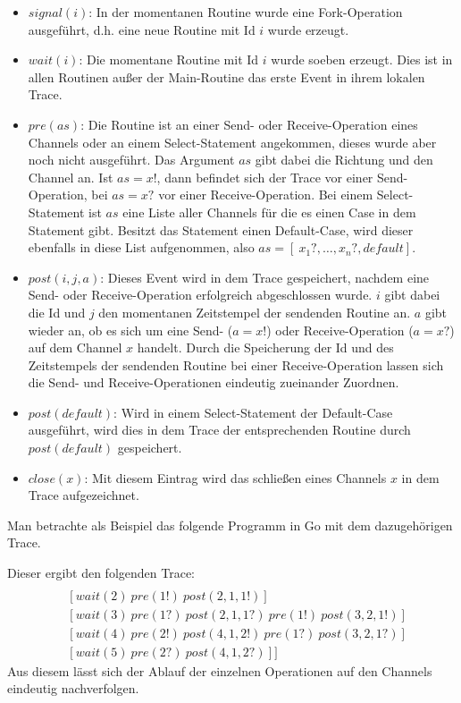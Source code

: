 \begin{itemize}
  \item $signal(i)$: In der momentanen Routine wurde eine Fork-Operation ausgeführt,
    d.h. eine neue Routine mit Id $i$ wurde erzeugt.
  \item $wait(i)$: Die momentane Routine mit Id $i$ wurde soeben erzeugt. Dies ist 
    in allen Routinen außer der Main-Routine das erste Event in ihrem lokalen Trace.
  \item $pre(as)$: Die Routine ist an einer Send- oder Receive-Operation eines 
    Channels oder an einem Select-Statement angekommen, dieses wurde aber noch nicht 
    ausgeführt. Das Argument $as$ gibt dabei die Richtung und den Channel an. 
    Ist $as = x!$, dann befindet sich der Trace vor einer Send-Operation, bei 
    $as = x?$ vor einer Receive-Operation. Bei einem Select-Statement ist 
    $as$ eine Liste aller Channels für die es einen 
    Case in dem Statement gibt. Besitzt das Statement einen Default-Case, wird
    dieser ebenfalls in diese List aufgenommen, also 
    $as = [\ x_1?, \ldots, x_n?, default]$.
  \item $post(i, j, a)$: Dieses Event wird in dem Trace gespeichert, nachdem 
    eine Send- oder Receive-Operation erfolgreich abgeschlossen wurde. 
    $i$ gibt dabei die Id und $j$ den momentanen Zeitstempel der sendenden Routine
    an. $a$ gibt wieder an, ob es sich um eine Send- ($a = x!$) oder Receive-Operation 
    ($a = x?$) auf dem Channel $x$ handelt. Durch die Speicherung der Id und des 
    Zeitstempels der sendenden Routine bei einer Receive-Operation lassen sich 
    die Send- und Receive-Operationen eindeutig zueinander Zuordnen.
  \item $post(default)$: Wird in einem Select-Statement der Default-Case ausgeführt,
    wird dies in dem Trace der entsprechenden Routine durch $post(default)$ 
    gespeichert.
  \item $close(x)$: Mit diesem Eintrag wird das schließen eines Channels $x$ 
    in dem Trace aufgezeichnet.
\end{itemize}

Man betrachte als Beispiel das folgende Programm in Go mit dem dazugehörigen 
Trace.

Dieser ergibt den folgenden Trace:
\begin{align*}
  [&[signal(2)\ signal(3)\ signal(4)\ signal(5)\ pre(3?, default)\ post(default)]\\
   &[wait(2)\ pre(1!)\ post(2, 1, 1!)]\\
   &[wait(3)\ pre(1?)\ post(2, 1, 1?)\ pre(1!)\ post(3, 2, 1!)]\\
   &[wait(4)\ pre(2!)\ post(4, 1, 2!)\ pre(1?)\ post(3, 2, 1?)]\\
   &[wait(5)\ pre(2?)\ post(4, 1, 2?)]]
\end{align*}
Aus diesem lässt sich der Ablauf der einzelnen Operationen auf den Channels
eindeutig nachverfolgen.


